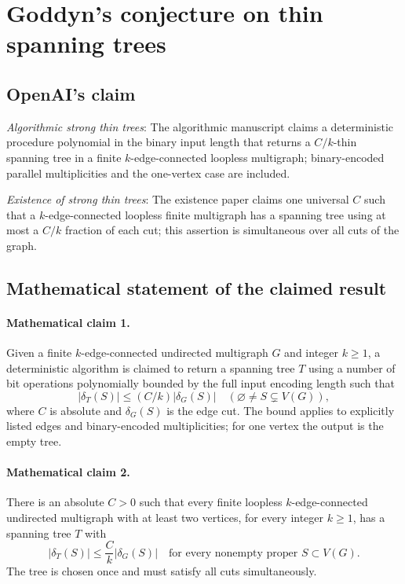 \documentclass[11pt]{article}
\begin{document}
\section*{Goddyn's conjecture on thin spanning trees}

\subsection{OpenAI's claim}
\textit{Algorithmic strong thin trees}: The algorithmic manuscript claims a deterministic procedure polynomial in the binary input length that returns a $C/k$-thin spanning tree in a finite $k$-edge-connected loopless multigraph; binary-encoded parallel multiplicities and the one-vertex case are included.

\textit{Existence of strong thin trees}: The existence paper claims one universal $C$ such that a $k$-edge-connected loopless finite multigraph has a spanning tree using at most a $C/k$ fraction of each cut; this assertion is simultaneous over all cuts of the graph.

\subsection{Mathematical statement of the claimed result}
\paragraph{Mathematical claim 1.} Given a finite $k$-edge-connected undirected multigraph $G$ and integer $k\ge1$, a deterministic algorithm is claimed to return a spanning tree $T$ using a number of bit operations polynomially bounded by the full input encoding length such that \[|\delta_T(S)|\le(C/k)|\delta_G(S)|\quad(\varnothing\ne S\subsetneq V(G)),\] where $C$ is absolute and $\delta_G(S)$ is the edge cut. The bound applies to explicitly listed edges and binary-encoded multiplicities; for one vertex the output is the empty tree.

\paragraph{Mathematical claim 2.} There is an absolute $C>0$ such that every finite loopless $k$-edge-connected undirected multigraph with at least two vertices, for every integer $k\ge1$, has a spanning tree $T$ with \[|\delta_T(S)|\le\frac Ck|\delta_G(S)|\quad\text{for every nonempty proper }S\subset V(G).\] The tree is chosen once and must satisfy all cuts simultaneously.
\end{document}
